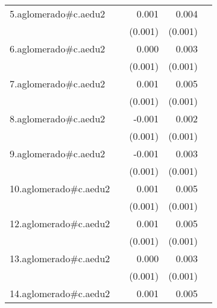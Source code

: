 {\begin{longtable}{l*{4}{D{.}{.}{-1}}}
\addlinespace
5.aglomerado#c.aedu2&                     &       0.001         &       0.004\sym{***}&                     \\
            &                     &     (0.001)         &     (0.001)         &                     \\
\addlinespace
6.aglomerado#c.aedu2&                     &       0.000         &       0.003\sym{***}&                     \\
            &                     &     (0.001)         &     (0.001)         &                     \\
\addlinespace
7.aglomerado#c.aedu2&                     &       0.001         &       0.005\sym{***}&                     \\
            &                     &     (0.001)         &     (0.001)         &                     \\
\addlinespace
8.aglomerado#c.aedu2&                     &      -0.001         &       0.002\sym{**} &                     \\
            &                     &     (0.001)         &     (0.001)         &                     \\
\addlinespace
9.aglomerado#c.aedu2&                     &      -0.001         &       0.003\sym{**} &                     \\
            &                     &     (0.001)         &     (0.001)         &                     \\
\addlinespace
10.aglomerado#c.aedu2&                     &       0.001         &       0.005\sym{***}&                     \\
            &                     &     (0.001)         &     (0.001)         &                     \\
\addlinespace
12.aglomerado#c.aedu2&                     &       0.001         &       0.005\sym{***}&                     \\
            &                     &     (0.001)         &     (0.001)         &                     \\
\addlinespace
13.aglomerado#c.aedu2&                     &       0.000         &       0.003\sym{***}&                     \\
            &                     &     (0.001)         &     (0.001)         &                     \\
\addlinespace
14.aglomerado#c.aedu2&                     &       0.001         &       0.005\sym{***}&                     \\

\end{longtable}}
